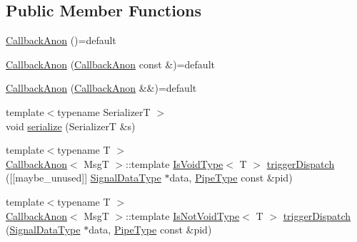 \subsection*{Public Member Functions}
\begin{DoxyCompactItemize}
\item 
\hyperlink{structvt_1_1pipe_1_1callback_1_1_callback_anon_aaca363b861f00c073c7b73dbef6e01fd}{Callback\+Anon} ()=default
\item 
\hyperlink{structvt_1_1pipe_1_1callback_1_1_callback_anon_a1979ced8fbd839d64f67eafb8fccdcff}{Callback\+Anon} (\hyperlink{structvt_1_1pipe_1_1callback_1_1_callback_anon}{Callback\+Anon} const \&)=default
\item 
\hyperlink{structvt_1_1pipe_1_1callback_1_1_callback_anon_ad9b8f6ae2a97e9e6b0e6cdbdbab34952}{Callback\+Anon} (\hyperlink{structvt_1_1pipe_1_1callback_1_1_callback_anon}{Callback\+Anon} \&\&)=default
\item 
{\footnotesize template$<$typename SerializerT $>$ }\\void \hyperlink{structvt_1_1pipe_1_1callback_1_1_callback_anon_a3a20757f336876eaed296bd11897bf97}{serialize} (SerializerT \&s)
\item 
{\footnotesize template$<$typename T $>$ }\\\hyperlink{structvt_1_1pipe_1_1callback_1_1_callback_anon}{Callback\+Anon}$<$ MsgT $>$\+::template \hyperlink{structvt_1_1pipe_1_1callback_1_1_callback_anon_a3aa19d4a1044d57ba4af22015331c20a}{Is\+Void\+Type}$<$ T $>$ \hyperlink{structvt_1_1pipe_1_1callback_1_1_callback_anon_adc36e958ce1416fda53159e441e31168}{trigger\+Dispatch} (\mbox{[}\mbox{[}maybe\+\_\+unused\mbox{]}\mbox{]} \hyperlink{structvt_1_1pipe_1_1callback_1_1_callback_anon_ac503b95feb44bb0b60c1d69e1ed29074}{Signal\+Data\+Type} $\ast$data, \hyperlink{namespacevt_ac9852acda74d1896f48f406cd72c7bd3}{Pipe\+Type} const \&pid)
\item 
{\footnotesize template$<$typename T $>$ }\\\hyperlink{structvt_1_1pipe_1_1callback_1_1_callback_anon}{Callback\+Anon}$<$ MsgT $>$\+::template \hyperlink{structvt_1_1pipe_1_1callback_1_1_callback_anon_a91e58fe2f8165c826cecedde7e4535cf}{Is\+Not\+Void\+Type}$<$ T $>$ \hyperlink{structvt_1_1pipe_1_1callback_1_1_callback_anon_a2d66de99b38b4c89f880c408346247de}{trigger\+Dispatch} (\hyperlink{structvt_1_1pipe_1_1callback_1_1_callback_anon_ac503b95feb44bb0b60c1d69e1ed29074}{Signal\+Data\+Type} $\ast$data, \hyperlink{namespacevt_ac9852acda74d1896f48f406cd72c7bd3}{Pipe\+Type} const \&pid)
\end{DoxyCompactItemize}
